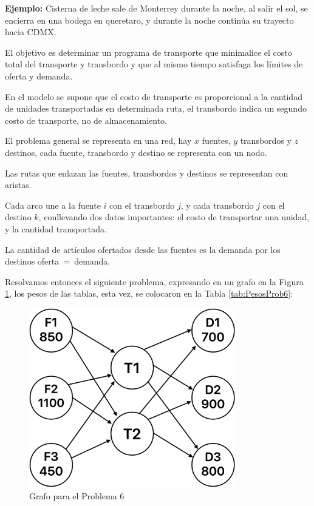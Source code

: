 \documentclass[12pt]{article}  %
\begin{document}
\textbf{Ejemplo:} Cisterna de leche sale de Monterrey durante la noche, al salir el sol, se encierra en una bodega en queretaro, y durante la noche continúa su trayecto hacia CDMX.

El objetivo es determinar un programa de transporte que minimalice el costo total del transporte y transbordo y que al mismo tiempo satisfaga los límites de oferta y demanda.

En el modelo se supone que el costo de transporte es proporcional a la cantidad de unidades transportadas en determinada ruta, el transbordo indica un segundo costo de transporte, no de almacenamiento.

El problema general se representa en una red, hay $x$ fuentes, $y$ transbordos y $z$ destinos, cada fuente, transbordo y destino se representa con un nodo.

Las rutas que enlazan las fuentes, transbordos y destinos se representan con aristas.

Cada arco une a la fuente $i$ con el transbordo $j$, y cada transbordo $j$ con el destino $k$, conllevando dos datos importantes: el costo de transportar una unidad, y la cantidad transportada.

La cantidad de artículos ofertados desde las fuentes es la demanda por los destinos \mbox{oferta = demanda}.

Resolvamos entonces el siguiente problema, expresando en un grafo en la Figura \ref{fig:grafProb6}, los pesos de las tablas, esta vez, se colocaron en la Tabla \ref{tab:PesosProb6}:

\begin{figure}[h]
    \centering
    \caption{Grafo para el Problema 6}
    \label{fig:grafProb6}
    \includegraphics[width=0.8\textwidth]{assets/grafoProb6.png}
\end{figure}
\end{document}
